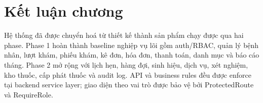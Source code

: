 
\section{Kết luận chương}

Hệ thống đã được chuyển hoá từ thiết kế thành sản phẩm chạy được qua hai phase. Phase 1 hoàn thành baseline nghiệp vụ lõi gồm auth/RBAC, quản lý bệnh nhân, lượt khám, phiếu khám, kê đơn, hóa đơn, thanh toán, danh mục và báo cáo tháng. Phase 2 mở rộng với lịch hẹn, hàng đợi, sinh hiệu, dịch vụ, xét nghiệm, kho thuốc, cấp phát thuốc và audit log. API và business rules đều được enforce tại backend service layer; giao diện theo vai trò được bảo vệ bởi ProtectedRoute và RequireRole.
